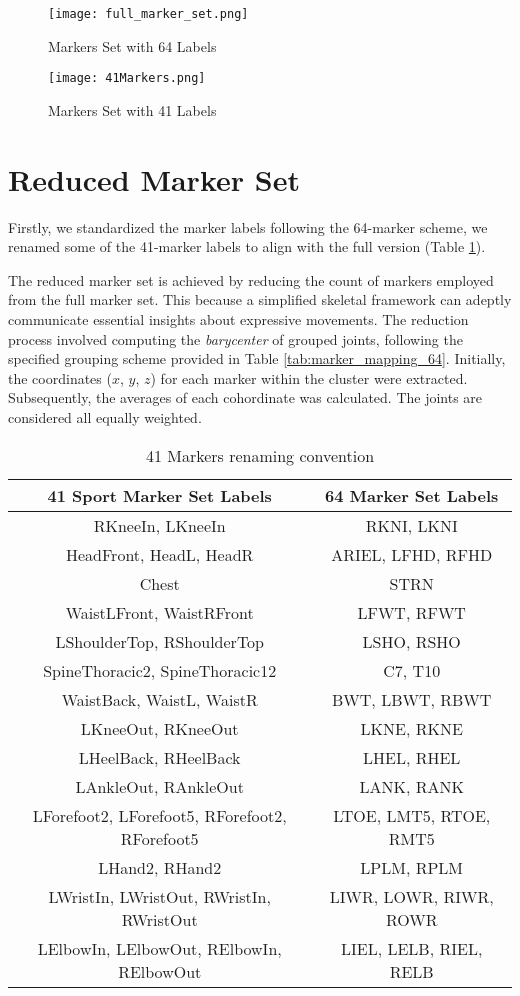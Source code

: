 \begin{figure}[H]
    \centering
    \texttt{[image: full\_marker\_set.png]}
    \caption{Markers Set with 64 Labels}
    \label{fig:64markers}
\end{figure}

\begin{figure}[H]
    \centering
    \texttt{[image: 41Markers.png]}
    \caption{Markers Set with 41 Labels}
    \label{fig:41markers}
\end{figure}
\clearpage
\section{Reduced Marker Set}
\label{sec:reduced_markers}
Firstly, we standardized the marker labels following the 64-marker scheme, 
we renamed some of the 41-marker labels to align with the full version (Table \ref{tab:marker_mapping_41}).

The reduced marker set is achieved by reducing the count of markers employed from the full marker set.
This because a simplified skeletal framework can adeptly communicate essential insights about expressive movements.
The reduction process involved computing the \textit{barycenter} of grouped joints, following the specified grouping scheme provided in Table \ref{tab:marker_mapping_64}. 
Initially, the coordinates ($x$, $y$, $z$) for each marker within the cluster were extracted. 
Subsequently, the averages of each cohordinate was calculated.
The joints are considered all equally weighted.

\begin{table}[H]
    \centering
    \begin{tabular}{||c||c||}
    \hline
    \textbf{41 Sport Marker Set Labels} & \textbf{64 Marker Set Labels} \\
    \hline
    RKneeIn, LKneeIn & RKNI, LKNI \\
    HeadFront, HeadL, HeadR & ARIEL, LFHD, RFHD \\
    Chest & STRN \\
    WaistLFront, WaistRFront & LFWT, RFWT \\
    LShoulderTop, RShoulderTop & LSHO, RSHO \\
    SpineThoracic2, SpineThoracic12 & C7, T10 \\
    WaistBack, WaistL, WaistR & BWT, LBWT, RBWT \\
    LKneeOut, RKneeOut & LKNE, RKNE \\
    LHeelBack, RHeelBack & LHEL, RHEL \\
    LAnkleOut, RAnkleOut & LANK, RANK \\
    LForefoot2, LForefoot5, RForefoot2, RForefoot5& LTOE, LMT5, RTOE, RMT5\\
    LHand2, RHand2 & LPLM, RPLM \\
    LWristIn, LWristOut, RWristIn, RWristOut & LIWR, LOWR, RIWR, ROWR \\
    LElbowIn, LElbowOut, RElbowIn, RElbowOut & LIEL, LELB, RIEL, RELB \\
    \hline
    \end{tabular}
    \caption{41 Markers renaming convention}
    \label{tab:marker_mapping_41}
\end{table}

